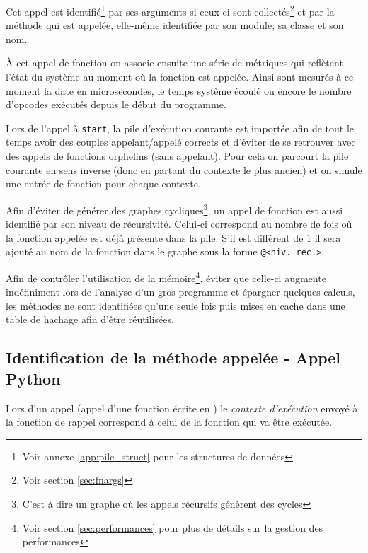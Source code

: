 Cet appel est identifié\footnote{Voir annexe \vref{app:pile_struct} pour les structures de données} par ses arguments si ceux-ci sont collectés\footnote{Voir section \vref{sec:fnargs}} et par la méthode qui est appelée, elle-même identifiée par son module, sa classe et son nom. 

À cet appel de fonction on associe ensuite une série de métriques qui reflètent l'état du système au moment où la fonction est appelée. Ainsi sont mesurés à ce moment la date en microsecondes, le temps système écoulé ou encore le nombre d'opcodes exécutés depuis le début du programme.

\begin{note}
Lors de l'appel à \verb|start|, la pile d'exécution courante est importée afin de tout le temps avoir des couples appelant/appelé corrects et d'éviter de se retrouver avec des appels de fonctions orphelins (sans appelant). Pour cela on parcourt la pile courante en sens inverse (donc en partant du contexte le plus ancien) et on simule une entrée de fonction pour chaque contexte.
\end{note}

\begin{note}
Afin d'éviter de générer des graphes cycliques\footnote{C'est à dire un graphe où les appels récursifs génèrent des cycles}, un appel de fonction est aussi identifié par son niveau de récursivité. Celui-ci correspond au nombre de fois où la fonction appelée est déjà présente dans la pile. S'il est différent de 1 il sera ajouté au nom de la fonction dans le graphe sous la forme \verb|@<niv. rec.>|.
\end{note}

\begin{note}[Performances]
Afin de contrôler l'utilisation de la mémoire\footnote{Voir section \vref{sec:performances} pour plus de détails sur la gestion des performances}, éviter que celle-ci augmente indéfiniment lors de l'analyse d'un gros programme et épargner quelques calculs, les méthodes ne sont identifiées qu'une seule fois puis mises en cache dans une table de hachage afin d'être réutilisées.
\end{note}

\subsection{Identification de la méthode appelée - Appel Python}
\label{ident-python}
Lors d'un appel \Python (appel d'une fonction écrite en \Python) le \emph{\gls{contexte d'exécution}} envoyé à la fonction de rappel correspond à celui de la fonction qui va être exécutée.

